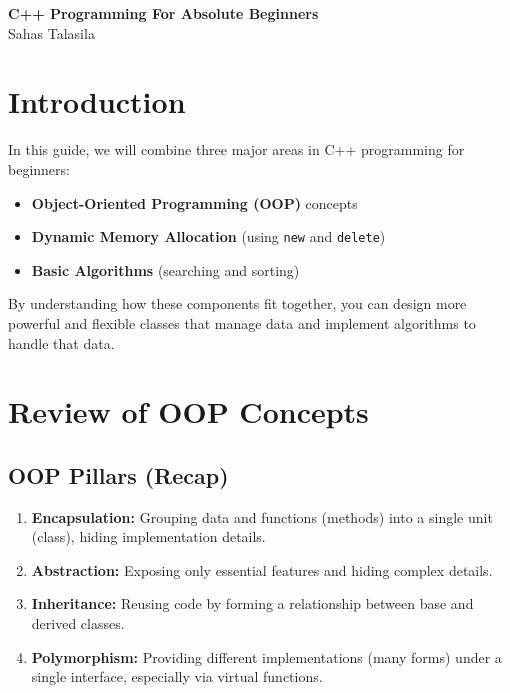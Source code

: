 \documentclass[a4paper,12pt]{article}
\begin{document}
\begin{titlepage}
    \centering
    \vspace*{2cm}
    \Huge{\textbf{C++ Programming For Absolute Beginners}} \\[1.5cm]
    \Large{Sahas Talasila} \\[1cm]
    \vfill
    \vfill
\end{titlepage}

\tableofcontents
\newpage
\section{Introduction}
In this guide, we will combine three major areas in C++ programming for beginners:
\begin{itemize}
    \item \textbf{Object-Oriented Programming (OOP)} concepts
    \item \textbf{Dynamic Memory Allocation} (using \texttt{new} and \texttt{delete})
    \item \textbf{Basic Algorithms} (searching and sorting)
\end{itemize}

By understanding how these components fit together, you can design more powerful and flexible classes that manage data and implement algorithms to handle that data.

\section{Review of OOP Concepts}
\subsection{OOP Pillars (Recap)}
\begin{enumerate}
    \item \textbf{Encapsulation:} Grouping data and functions (methods) into a single unit (class), hiding implementation details.
    \item \textbf{Abstraction:} Exposing only essential features and hiding complex details.
    \item \textbf{Inheritance:} Reusing code by forming a relationship between base and derived classes.
    \item \textbf{Polymorphism:} Providing different implementations (many forms) under a single interface, especially via virtual functions.
\end{enumerate}
\end{document}
